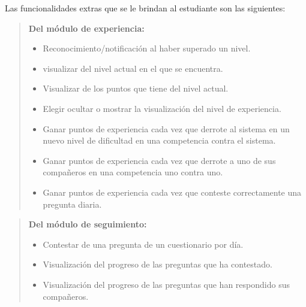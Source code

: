     \noindent
    Las funcionalidades extras que se le brindan al estudiante son las siguientes:

    \begin{quote}
    {\bf Del módulo de experiencia:}
        \begin{itemize}
        \item Reconocimiento/notificación al haber superado un nivel.
        \item visualizar del nivel actual en el que se encuentra.
        \item Visualizar de los puntos que tiene del nivel actual.
        \item Elegir ocultar o mostrar la visualización del nivel de experiencia.

        \item Ganar puntos de experiencia cada vez que derrote al sistema en un
              nuevo nivel de dificultad en una competencia contra el sistema.

        \item Ganar puntos de experiencia cada vez que derrote a uno
              de sus compañeros en una competencia uno contra uno.

        \item Ganar puntos de experiencia cada vez que conteste correctamente
              una pregunta diaria.
        \end{itemize}
    \end{quote}

    \begin{quote}
    {\bf Del módulo de seguimiento:}
        \begin{itemize}
        \item Contestar de una pregunta de un cuestionario por día.
        \item Visualización del progreso de las preguntas que ha contestado.
        \item Visualización del progreso de las preguntas que han respondido sus compañeros.
        \end{itemize}
    \end{quote}

